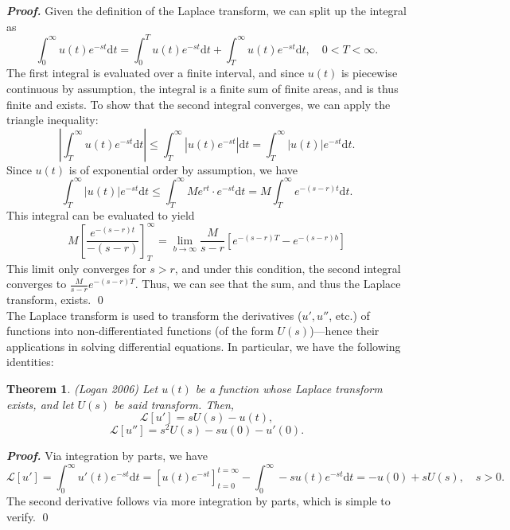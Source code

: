 \documentclass[12pt]{article}
\theoremstyle{plain}
\newtheorem{theorem}{Theorem}[section]
\theoremstyle{definition}
\begin{document}
\noindent \emph{\textbf{Proof.}} Given the definition of the Laplace transform, we can split up the integral as
\begin{equation}
    \int_{0}^{\infty}u(t)e^{-st}\mathrm{d}t = \int_{0}^{T}u(t)e^{-st}\mathrm{d}t + \int_{T}^{\infty}u(t)e^{-st}\mathrm{d}t, \quad 0<T<\infty.
\end{equation}
The first integral is evaluated over a finite interval, and since $u(t)$ is piecewise continuous by assumption, the integral is a finite sum of finite areas, and is thus finite and exists. To show that the second integral converges, we can apply the triangle inequality:
\begin{equation}
    \left|\int_{T}^{\infty}u(t)e^{-st}\mathrm{d}t\right| \leq \int_{T}^{\infty} \left|u(t)e^{-st}\right|\mathrm{d}t = \int_{T}^{\infty} \left|u(t)\right| e^{-st}\mathrm{d}t.
\end{equation}
Since $u(t)$ is of exponential order by assumption, we have
\begin{equation}
    \int_{T}^{\infty}\left|u(t)\right|e^{-st}\mathrm{d}t \leq \int_{T}^{\infty}Me^{rt}\cdot e^{-st}\mathrm{d}t = M\int_{T}^{\infty}e^{-(s-r)t}\mathrm{d}t.
\end{equation}
This integral can be evaluated to yield
\begin{equation}
    M\left[\frac{e^{-(s-r)t}}{-(s-r)}\right]_{T}^{\infty}=\lim_{b\to \infty} \frac{M}{s-r}\left[e^{-(s-r)T} - e^{-(s-r)b}\right]
\end{equation}
This limit only converges for $s>r$, and under this condition, the second integral converges to $\frac{M}{s-r}e^{-(s-r)T}$. Thus, we can see that the sum, and thus the Laplace transform, exists. \qed \\

The Laplace transform is used to transform the derivatives ($u', u''$, etc.) of functions into non-differentiated functions (of the form $U(s)$)---hence their applications in solving differential equations. In particular, we have the following identities:
\begin{theorem}
    (Logan 2006) Let $u(t)$ be a function whose Laplace transform exists, and let $U(s)$ be said transform. Then,
    \begin{equation*}
        \mathcal{L}[u'] = sU(s) - u(t),
    \end{equation*}
    \begin{equation*}
        \mathcal{L}[u''] = s^2U(s) - su(0) - u'(0).
    \end{equation*}
\end{theorem}
\emph{\textbf{Proof.}} Via integration by parts, we have
\[
\mathcal{L}[u'] = \int_{0}^{\infty}u'(t)e^{-st} \mathrm{d}t = \left[u(t)e^{-st}\right]_{t=0}^{t=\infty} - \int_{0}^{\infty}-su(t)e^{-st} \mathrm{d}t = -u(0)+sU(s), \quad s>0.
\]
The second derivative follows via more integration by parts, which is simple to verify. \qed \\
\end{document}
